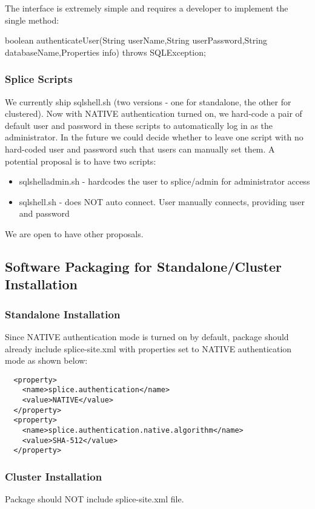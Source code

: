 \documentclass{article}
\begin{document}
The interface is extremely simple and requires a developer to implement the
single method:

boolean authenticateUser(String userName,String userPassword,String
databaseName,Properties info) throws SQLException;

\subsubsection{Splice Scripts}

We currently ship sqlshell.sh (two versions - one for standalone, the other for clustered). Now with NATIVE authentication 
turned on, we hard-code a pair of default user and password in these scripts to automatically log in as the administrator.
In the future we could decide whether to leave one script with no hard-coded user and password such that users can manually 
set them. A potential proposal is to have two scripts:  

\begin{itemize}
\item sqlshelladmin.sh - hardcodes the user to splice/admin for administrator access
\item sqlshell.sh - does NOT auto connect.  User manually connects, providing user and password
\end{itemize}

We are open to have other proposals. 

\subsection{Software Packaging for Standalone/Cluster Installation}
\subsubsection{Standalone Installation}
Since NATIVE authentication mode is turned on by default, package should already include splice-site.xml with properties set to NATIVE authentication mode as shown below:
\begin{lstlisting}
  <property> 
    <name>splice.authentication</name> 
    <value>NATIVE</value> 
  </property> 
  <property> 
    <name>splice.authentication.native.algorithm</name> 
    <value>SHA-512</value> 
  </property> 
\end{lstlisting}

\subsubsection{Cluster Installation}
Package should NOT include splice-site.xml file.
\end{document}

